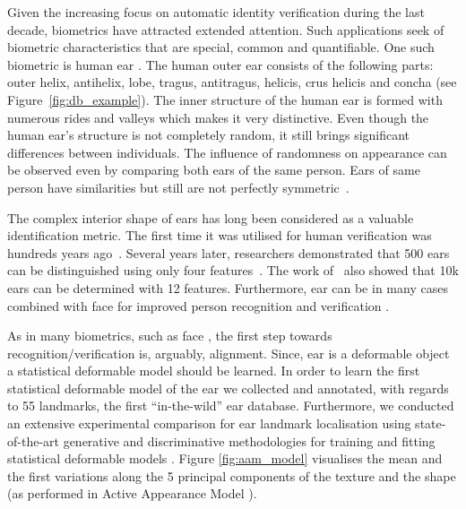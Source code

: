 Given the increasing focus on automatic identity verification during the last decade, biometrics have attracted extended attention. Such applications seek of biometric characteristics that are special, common and quantifiable. One such biometric is human ear \cite{chang2003comparison,chen2007human}. The human outer ear consists of the following parts: outer helix, antihelix, lobe, tragus, antitragus, helicis, crus helicis and concha (see Figure~\ref{fig:db_example}). The inner structure of the human ear is formed with numerous rides and valleys which makes it very distinctive. Even though the human ear's structure is not completely random, it still brings significant differences between individuals. The influence of randomness on appearance can be observed even by comparing both ears of the same person. Ears of same person have similarities but still are not perfectly symmetric~\cite{pflug2012ear}.

The complex interior shape of ears has long been considered as a valuable identification metric. The first time it was utilised for human verification was hundreds years ago~\cite{bertillon1890photographie}. Several years later, researchers demonstrated that 500 ears can be distinguished using only four features~\cite{imhofer1906bedeutung}. The work of~\cite{iannarelli1989ear} also showed that 10k ears can be determined with 12 features. Furthermore, ear can be in many cases combined with face for improved person recognition and verification  \cite{chang2003comparison}.

As in many biometrics, such as face \cite{taigman2014deepface}, the first step towards  recognition/verification is, arguably, alignment. Since, ear is a deformable object a statistical deformable model should be learned. In order to learn the first statistical deformable model of the ear we collected and annotated, with regards to 55 landmarks, the first ``in-the-wild'' ear database. Furthermore, we conducted an extensive experimental comparison for ear landmark localisation using state-of-the-art generative and discriminative methodologies  for training and fitting statistical deformable models \cite{Cootes1995, Cootes2001, Matthews2004, Saragih2011, Belhumeur2011, Zhu2012,Cao2012, Asthana2013, Tzimiropoulos2014, Asthana2014, antonakos2015feature}. Figure \ref{fig:aam_model} visualises the mean and the first variations along the 5 principal components of the texture and the shape (as performed in Active Appearance Model \cite{Cootes2001, Matthews2004, Tzimiropoulos2014, antonakos2015feature}).  

